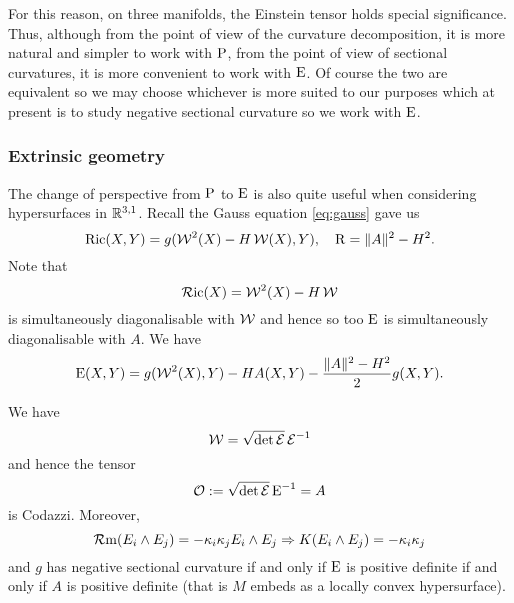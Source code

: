 \documentclass[a4paper, 12pt]{amsart}
\begin{document}
For this reason, on three manifolds, the Einstein tensor holds special significance. Thus, although from the point of view of the curvature decomposition, it is more natural and simpler to work with \(\operatorname{P}\), from the point of view of sectional curvatures, it is more convenient to work with \(\operatorname{E}\). Of course the two are equivalent so we may choose whichever is more suited to our purposes which at present is to study negative sectional curvature so we work with \(\operatorname{E}\).

\subsubsection{Extrinsic geometry}

The change of perspective from \(\operatorname{P}\) to \(\operatorname{E}\) is also quite useful when considering hypersurfaces in \(\mathbb{R}^{3,1}\). Recall the Gauss equation \eqref{eq:gauss} gave us
\[
\operatorname{Ric}(X, Y) = g(\operatorname{\mathcal{W}}^2(X) - H \operatorname{\mathcal{W}}(X), Y), \quad \operatorname{R} = \|A\|^2 - H^2.
\]
Note that
\[
\operatorname{\mathcal{R}ic} (X) = \operatorname{\mathcal{W}}^2(X) - H \operatorname{\mathcal{W}}
\]
is simultaneously diagonalisable with \(\operatorname{\mathcal{W}}\) and hence so too \(\operatorname{E}\) is simultaneously diagonalisable with \(A\). We have
\begin{equation}
\label{eq:ein_extrinsic}
\operatorname{E} (X, Y) = g(\operatorname{\mathcal{W}}^2(X), Y) - H A(X, Y) - \frac{\|A\|^2 - H^2}{2} g (X, Y).
\end{equation}

\begin{lemma}
\label{lem:ein_W}

We have
\[
\operatorname{\mathcal{W}} = \sqrt{\det \operatorname{\mathcal{E}}} \operatorname{\mathcal{E}}^{-1}
\]
and hence the tensor
\[
\operatorname{\mathcal{O}} := \sqrt{\det \operatorname{\mathcal{E}}} \operatorname{E}^{-1} = A
\]
is Codazzi. Moreover,
\[
\operatorname{\mathcal{R}m} (E_i \wedge E_j) = -\kappa_i \kappa_j E_i \wedge E_j \Rightarrow K(E_i \wedge E_j) = -\kappa_i \kappa_j
\]
and \(g\) has negative sectional curvature if and only if \(\operatorname{E}\) is positive definite if and only if \(A\) is positive definite (that is \(M\) embeds as a locally convex hypersurface).
\end{lemma}
\end{document}
